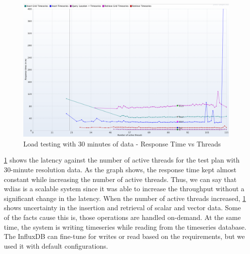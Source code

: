 \begin{figure}[htp]
    \centering
    \includegraphics[width=1.0\textwidth]{results/obs/all/obs_all_30m_response_times_vs_threads.png}
    \caption{Load testing with 30 minutes of data - Response Time vs Threads}
    \label{fi:test_obs_all_30m_response_vs_threads}
\end{figure}

\cref{fi:test_obs_all_30m_response_vs_threads} shows the latency against the number of active threads for the test plan with 30-minute resolution data. As the graph shows, the response time kept almost constant while increasing the number of active threads. Thus, we can say that \acrshort{wdias} is a scalable system since it was able to increase the throughput without a significant change in the latency. When the number of active threads increased, \cref{fi:test_obs_all_30m_response_vs_threads} shows uncertainty in the insertion and retrieval of scalar and vector data. Some of the facts cause this is, those operations are handled on-demand. At the same time, the system is writing timeseries while reading from the timeseries database. The InfluxDB can fine-tune for writes or read based on the requirements, but we used it with default configurations.

